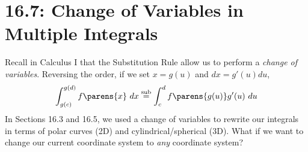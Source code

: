 \documentclass[../mathNotesPreamble]{subfiles}
\begin{document}
\section{16.7: Change of Variables in Multiple Integrals}


\noindent Recall in Calculus I that the Substitution Rule allow us to perform a \textit{change of variables}. Reversing the order, if we set $x=g(u)$ and $dx=g'(u)du$,
\[
\int_{g(c)}^{g(d)} f\parens{x}~dx\overset{\text{sub}}{=}\int_{c}^{d}f\parens{g(u)}g'(u)~du
\]
\noindent In Sections 16.3 and 16.5, we used a change of variables to rewrite our integrals in terms of polar curves (2D) and cylindrical/spherical (3D). What if we want to change our current coordinate system to \textit{any} coordinate system?\\
\end{document}

